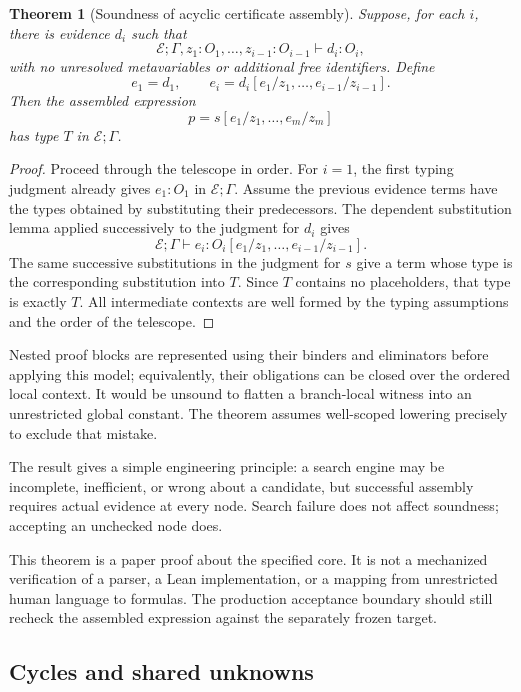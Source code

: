 \documentclass[11pt,a4paper]{article}
\newtheorem{theorem}{Theorem}[section]
\newcommand{\EE}{\mathcal E}
\begin{document}
\begin{theorem}[Soundness of acyclic certificate assembly]
\label{thm:assembly}
Suppose, for each $i$, there is evidence $d_i$ such that
\[
 \EE;\Gamma,z_1:O_1,\ldots,z_{i-1}:O_{i-1}\vdash d_i:O_i,
\]
with no unresolved metavariables or additional free identifiers. Define
\[
 e_1=d_1,\qquad e_i=d_i[e_1/z_1,\ldots,e_{i-1}/z_{i-1}].
\]
Then the assembled expression
\[
 p=s[e_1/z_1,\ldots,e_m/z_m]
\]
has type $T$ in $\EE;\Gamma$.
\end{theorem}

\begin{proof}
Proceed through the telescope in order. For $i=1$, the first typing judgment already gives $e_1:O_1$ in $\EE;\Gamma$. Assume the previous evidence terms have the types obtained by substituting their predecessors. The dependent substitution lemma applied successively to the judgment for $d_i$ gives
\[
 \EE;\Gamma\vdash e_i:
 O_i[e_1/z_1,\ldots,e_{i-1}/z_{i-1}].
\]
The same successive substitutions in the judgment for $s$ give a term whose type is the corresponding substitution into $T$. Since $T$ contains no placeholders, that type is exactly $T$. All intermediate contexts are well formed by the typing assumptions and the order of the telescope.
\end{proof}

Nested proof blocks are represented using their binders and eliminators before applying this model; equivalently, their obligations can be closed over the ordered local context. It would be unsound to flatten a branch-local witness into an unrestricted global constant. The theorem assumes well-scoped lowering precisely to exclude that mistake.

The result gives a simple engineering principle: a search engine may be incomplete, inefficient, or wrong about a candidate, but successful assembly requires actual evidence at every node. Search failure does not affect soundness; accepting an unchecked node does.

This theorem is a paper proof about the specified core. It is not a mechanized verification of a parser, a Lean implementation, or a mapping from unrestricted human language to formulas. The production acceptance boundary should still recheck the assembled expression against the separately frozen target.

\subsection{Cycles and shared unknowns}
\end{document}
